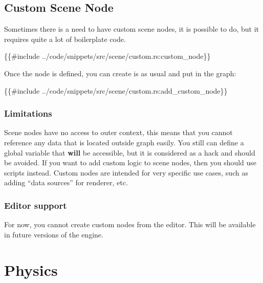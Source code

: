 \documentclass[
]{book}
\newenvironment{Shaded}{\begin{snugshade}}{\end{snugshade}}
\newcommand{\NormalTok}[1]{#1}
\theoremstyle{definition}
\theoremstyle{definition}
\theoremstyle{definition}
\theoremstyle{definition}
\theoremstyle{remark}
\begin{document}
\section{Custom Scene Node}\label{custom-scene-node}

Sometimes there is a need to have custom scene nodes, it is possible to do, but it requires quite a lot of boilerplate code.

\begin{Shaded}
\begin{Highlighting}[]
\NormalTok{\{\{\#include ../code/snippets/src/scene/custom.rs:custom\_node\}\}}
\end{Highlighting}
\end{Shaded}

Once the node is defined, you can create is as usual and put in the graph:

\begin{Shaded}
\begin{Highlighting}[]
\NormalTok{\{\{\#include ../code/snippets/src/scene/custom.rs:add\_custom\_node\}\}}
\end{Highlighting}
\end{Shaded}

\subsection{Limitations}\label{limitations-1}

Scene nodes have no access to outer context, this means that you cannot reference any data that is located outside graph easily. You still can define a global variable that \textbf{will} be accessible, but it is considered as a hack and should be avoided. If you want to add custom logic to scene nodes, then you should use scripts instead. Custom nodes are intended for very specific use cases, such as adding ``data sources'' for renderer, etc.

\subsection{Editor support}\label{editor-support}

For now, you cannot create custom nodes from the editor. This will be available in future versions of the engine.

\chapter{Physics}\label{physics-2}
\end{document}
